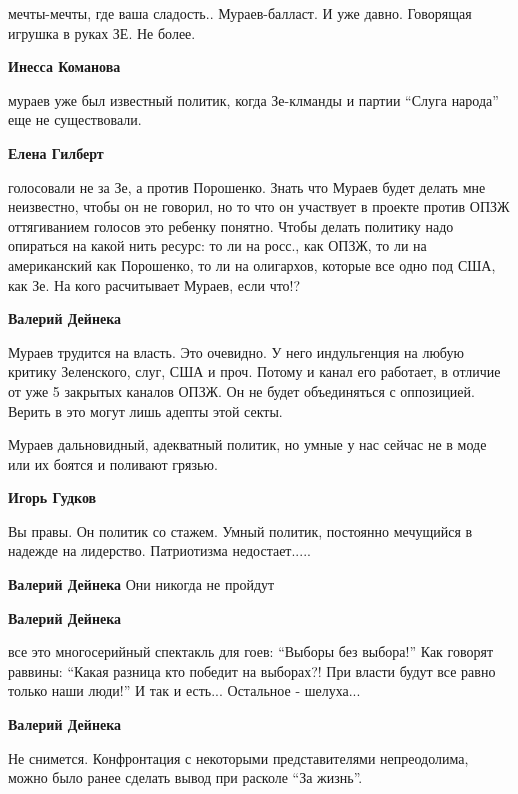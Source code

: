 \begin{itemize}
\begin{itemize}
мечты-мечты, где ваша сладость..
Мураев-балласт. И уже давно. Говорящая игрушка в руках ЗЕ. Не более.

\textbf{Инесса Команова}

мураев уже был известный политик, когда Зе-клманды и партии \enquote{Слуга народа} еще
не существовали.

\textbf{Елена Гилберт} 

голосовали не за Зе, а против Порошенко. Знать что Мураев будет делать мне
неизвестно, чтобы он не говорил, но то что он участвует в проекте против ОПЗЖ
оттягиванием голосов это ребенку понятно. Чтобы делать политику надо опираться
на какой нить ресурс: то ли на росс., как ОПЗЖ, то ли на американский как
Порошенко, то ли на олигархов, которые все одно под США, как Зе. На кого
расчитывает Мураев, если что!?

\textbf{Валерий Дейнека} 

Мураев трудится на власть. Это очевидно.
У него индульгенция на любую критику Зеленского, слуг, США и проч.
Потому и канал его работает, в отличие от уже 5 закрытых каналов ОПЗЖ.
Он не будет объединяться с оппозицией.
Верить в это могут лишь адепты этой секты.


Мураев дальновидный, адекватный политик, но умные у нас сейчас не в моде или их
боятся и поливают грязью.

\textbf{Игорь Гудков}

Вы правы. Он политик со стажем. Умный политик, постоянно мечущийся в надежде на
лидерство. Патриотизма недостает.....

\textbf{Валерий Дейнека} Они никогда не пройдут

\textbf{Валерий Дейнека} 

все это многосерийный спектакль для гоев: \enquote{Выборы без выбора!}
Как говорят раввины: \enquote{Какая разница кто победит на выборах?! При власти будут все равно только наши люди!}
И так и есть... Остальное - шелуха...

\textbf{Валерий Дейнека} 

Не снимется. Конфронтация с некоторыми представителями непреодолима, можно было
ранее сделать вывод при расколе \enquote{За жизнь}.

\end{itemize} %

\end{itemize} %
